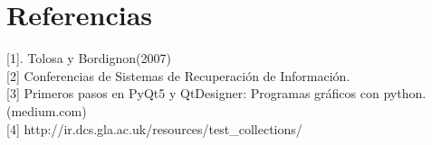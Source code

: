 \documentclass{llncs}
\begin{document}
%
\section{Referencias}
%


[1]. Tolosa y Bordignon(2007)\\

[2] Conferencias de Sistemas de Recuperaci\'on de Informaci\'on.\\

[3] Primeros pasos en PyQt5 y QtDesigner: Programas gr\'aficos con python. (medium.com)\\

[4] http://ir.dcs.gla.ac.uk/resources/test\_collections/
\end{document}
